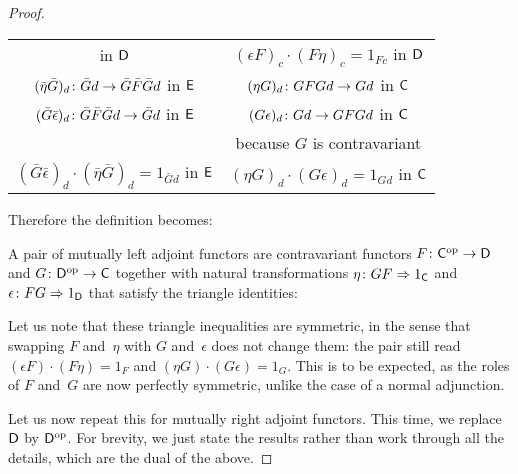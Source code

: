 \documentclass[../../solutions]{subfiles}
\begin{document}
\begin{proof}
\begin{center}
\begin{tabular}{c|c}
      in ${\mathsf{D}}$
          & $(\epsilon F)_c\cdot (F\eta)_c = 1_{Fc}$ in ${\mathsf{D}}$ \\
      ${(\bar\eta\bar G)_d}\colon{\bar G d}\to{\bar G \bar F \bar G d}$ in
      ${\mathsf{E}}$
          & ${(\eta G)_d}\colon{GFGd}\to{Gd}$ in ${\mathsf{C}}$ \\
      ${(\bar G\bar\epsilon)_d}\colon{\bar G \bar F \bar G d}\to{\bar G
      d}$ in ${\mathsf{E}}$
          & ${(G\epsilon)_d}\colon{Gd}\to{GFGd}$ in ${\mathsf{C}}$ \\[-5pt]
          & because $G$ is contravariant \\
      $(\bar G\bar\epsilon)_d\cdot (\bar\eta \bar G)_d = 1_{\bar G d}$
      in ${\mathsf{E}}$
          & $(\eta G)_d\cdot (G\epsilon)_d = 1_{Gd}$ in ${\mathsf{C}}$
    \end{tabular}
  \end{center}
  Therefore the definition becomes:
  \begingroup
  \renewcommand{\theHtheorem}{\theHsection.\arabic{theorem}.left}
  \begin{definition}
    A pair of mutually left adjoint functors are contravariant
    functors ${F}\colon{{\mathsf{C}}^{\mathrm{op}}}\to{{\mathsf{D}}}$ and ${G}\colon{{\mathsf{D}}^{\mathrm{op}}}\to{{\mathsf{C}}}$
    together with natural transformations
    ${\eta}\colon{GF}\Rightarrow{1_{\mathsf{C}}}$ and ${\epsilon}\colon{FG}\Rightarrow{1_{\mathsf{D}}}$ that
    satisfy the triangle identities:
    \begin{center}
    \end{center}
  \end{definition}
  \popthm
  \endgroup

  Let us note that these triangle inequalities are symmetric, in the
  sense that swapping $F$ and~$\eta$ with $G$ and~$\epsilon$ does not
  change them: the pair still read $(\epsilon F)\cdot(F\eta)=1_F$ and
  $(\eta G)\cdot(G\epsilon)=1_G$.  This is to be expected, as the
  roles of $F$ and~$G$ are now perfectly symmetric, unlike the case of
  a normal adjunction.

  \bigskip

  Let us now repeat this for mutually right adjoint functors.  This
  time, we replace ${\mathsf{D}}$ by ${\mathsf{D}}^{\mathrm{op}}$.  For brevity, we just state the
  results rather than work through all the details, which are the dual
  of the above.


\end{proof}
\end{document}
